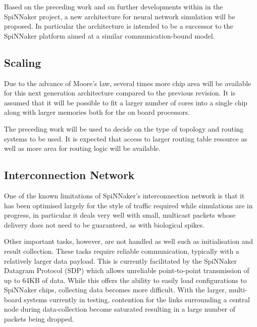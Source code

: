 		
		Based on the preceding work and on further developments within in the
		SpiNNaker project, a new architecture for neural network simulation will be
		proposed. In particular the architecture is intended to be a successor to
		the SpiNNaker platform aimed at a similar communication-bound model.
		
		\subsection{Scaling}
			
			Due to the advance of Moore's law, several times more chip area will be
			available for this next generation architecture compared to the previous
			revision. It is assumed that it will be possible to fit a larger number of
			cores into a single chip along with larger memories both for the on board
			processors.
			
			The preceding work will be used to decide on the type of topology and
			routing systems to be used. It is expected that access to larger routing
			table resource as well as more area for routing logic will be available.
		
		\subsection{Interconnection Network}
			
			One of the known limitations of SpiNNaker's interconnection network is
			that it has been optimised largely for the style of traffic required while
			simulations are in progress, in particular it deals very well with small,
			multicast packets whose delivery does not need to be guaranteed, as with
			biological spikes.
			
			Other important tasks, however, are not handled as well such as
			initialisation and result collection. These tasks require reliable
			communication, typically with a relatively larger data payload. This is
			currently facilitated by the SpiNNaker Datagram Protocol (SDP)
			\cite{temple11} which allows unreliable point-to-point transmission of up
			to 64KB of data. While this offers the ability to easily load
			configurations to SpiNNaker chips, collecting data becomes more difficult.
			With the larger, multi-board systems currently in testing, contention for
			the links surrounding a central node during data-collection become
			saturated resulting in a large number of packets being dropped.
		
